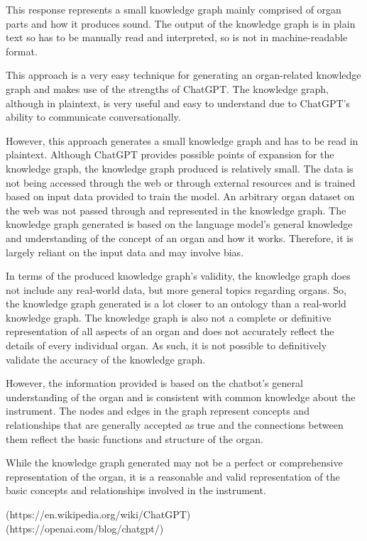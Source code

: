 This response represents a small knowledge graph mainly comprised of organ parts and how it produces sound. The output of the knowledge graph is in plain text so has to be manually read and interpreted, so is not in machine-readable format. 

This approach is a very easy technique for generating an organ-related knowledge graph and makes use of the strengths of ChatGPT. The knowledge graph, although in plaintext, is very useful and easy to understand due to ChatGPT's ability to communicate conversationally. 

However, this approach generates a small knowledge graph and has to be read in plaintext. Although ChatGPT provides possible points of expansion for the knowledge graph, the knowledge graph produced is relatively small. The data is not being accessed through the web or through external resources and is trained based on input data provided to train the model. An arbitrary organ dataset on the web was not passed through and represented in the knowledge graph. The knowledge graph generated is based on the language model's general knowledge and understanding of the concept of an organ and how it works. Therefore, it is largely reliant on the input data and may involve bias. 

In terms of the produced knowledge graph's validity, the knowledge graph does not include any real-world data, but more general topics regarding organs. So, the knowledge graph generated is a lot closer to an ontology than a real-world knowledge graph. The knowledge graph is also not a complete or definitive representation of all aspects of an organ and does not accurately reflect the details of every individual organ. As such, it is not possible to definitively validate the accuracy of the knowledge graph. 

However, the information provided is based on the chatbot's general understanding of the organ and is consistent with common knowledge about the instrument. The nodes and edges in the graph represent concepts and relationships that are generally accepted as true and the connections between them reflect the basic functions and structure of the organ.

While the knowledge graph generated may not be a perfect or comprehensive representation of the organ, it is a reasonable and valid representation of the basic concepts and relationships involved in the instrument.

\noindent (https://en.wikipedia.org/wiki/ChatGPT)\\
(https://openai.com/blog/chatgpt/)